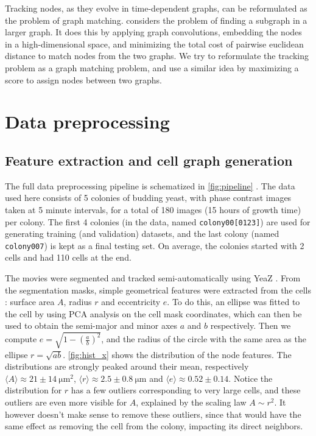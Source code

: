 \documentclass[10pt,conference,compsocconf,a4paper]{IEEEtran}
\newcommand{\nunit}[1]{\ \si{#1}}  %
\newcommand{\avg}[1]{\langle{#1}\rangle}
\newcommand*{\shortautoref}[1]{%
	\begingroup
	\def\equationautorefname{\textsc{Eq.}}%
	\def\tableautorefname{\textsc{Tab.}}%
	\def\figureautorefname{\textsc{Fig.}}%
	\autoref{#1}%
	\endgroup
}
\begin{document}
	Tracking nodes, as they evolve in time-dependent graphs, can be reformulated as the problem of graph matching. \cite{kipf_semi-supervised_2017} considers the problem of finding a subgraph in a larger graph. It does this by applying graph convolutions, embedding the nodes in a high-dimensional space, and minimizing the total cost of pairwise euclidean distance to match nodes from the two graphs. We try to reformulate the tracking problem as a graph matching problem, and use a similar idea by maximizing a score to assign nodes between two graphs.



\section{Data preprocessing} \label{sec:data_preprocessing}

	\subsection{Feature extraction and cell graph generation}

		The full data preprocessing pipeline is schematized in \shortautoref{fig:pipeline}. The data used here consists of 5 colonies of budding yeast, with phase contrast images taken at 5 minute intervals, for a total of 180 images (15 hours of growth time) per colony. The first 4 colonies (in the data, named \texttt{colony00[0123]}) are used for generating training (and validation) datasets, and the last colony (named \texttt{colony007}) is kept as a final testing set. On average, the colonies started with 2 cells and had 110 cells at the end.

		The movies were segmented and tracked semi-automatically using YeaZ \cite{dietler_convolutional_2020}. From the segmentation masks, simple geometrical features were extracted from the cells : surface area $A$, radius $r$ and eccentricity $e$. To do this, an ellipse was fitted to the cell by using PCA analysis on the cell mask coordinates, which can then be used to obtain the semi-major and minor axes $a$ and $b$ respectively. Then we compute $e=\sqrt{1-(\frac{a}{b})^2}$, and the radius of the circle with the same area as the ellipse $r=\sqrt{ab}$. \shortautoref{fig:hist_x} shows the distribution of the node features. The distributions are strongly peaked around their mean, respectively $\avg{A} \approx 21 \pm 14 \nunit{\micro \meter \squared}$, $\avg{r} \approx 2.5 \pm 0.8 \nunit{\micro \meter}$ and $\avg{e} \approx 0.52 \pm 0.14$. Notice the distribution for $r$ has a few outliers corresponding to very large cells, and these outliers are even more visible for $A$, explained by the scaling law $A \sim r^2$. It however doesn't make sense to remove these outliers, since that would have the same effect as removing the cell from the colony, impacting its direct neighbors.
\end{document}
